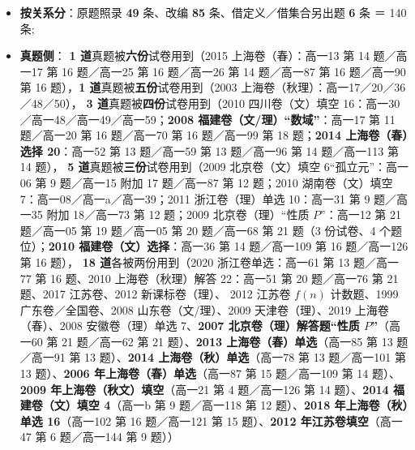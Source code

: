 \documentclass[a4paper,11pt]{article}
\providecommand{\tightlist}{%
  \setlength{\itemsep}{0pt}\setlength{\parskip}{0pt}}
\begin{document}
\begin{itemize}
\tightlist
\item
  \textbf{按关系分}：原题照录 \textbf{49} 条、改编 \textbf{85} 条、借定义／借集合另出题 \textbf{6} 条 ＝ 140 条;
\item
  \textbf{真题侧}：
  \textbf{1 道}真题被\textbf{六份}试卷用到（2015 上海卷（春）：高一13 第 14 题／高一17 第 16 题／高一25 第 16 题／高一26 第 14 题／高一87 第 16 题／高一90 第 16 题），\textbf{1 道}真题被\textbf{五份}试卷用到（2003 上海卷（秋理）：高一17／20／36／48／50），
  \textbf{3 道}真题被\textbf{四份}试卷用到（2010 四川卷（文）填空 16：高一30／高一48／高一49／高一59；\textbf{2008 福建卷（文/理）``数域''}：高一17 第 11 题／高一20 第 16 题／高一70 第 16 题／高一99 第 18 题；\textbf{2014 上海卷（春）选择 20}：高一52 第 13 题／高一59 第 13 题／高一96 第 14 题／高一113 第 14 题），
  \textbf{5 道}真题被\textbf{三份}试卷用到（2009 北京卷（文）填空 6``孤立元''：高一06 第 9 题／高一15 附加 17 题／高一87 第 12 题；2010 湖南卷（文）填空 7：高一08／高一a／高一39；2011 浙江卷（理）单选 10：高一31 第 9 题／高一35 附加 18／高一73 第 12 题；2009 北京卷（理）``性质 \(P\)''：高一12 第 21 题／高一05 第 19 题／高一05 第 20 题／高一68 第 21 题（3 份试卷、4 个题位）；\textbf{2010 福建卷（文）选择}：高一36 第 14 题／高一109 第 16 题／高一126 第 16 题），
  \textbf{18 道}各被两份用到（2020 浙江卷单选：高一61 第 13 题／高一77 第 16 题、2010 上海卷（秋理）解答 22：高一51 第 20 题／高一76 第 21 题、2017 江苏卷、2012 新课标卷（理）、
  2012 江苏卷 \(f(n)\) 计数题、1999 广东卷／全国卷、2008 山东卷（文/理）、2009 天津卷（理）、2019 上海卷（春）、2008 安徽卷（理）单选 7、\textbf{2007 北京卷（理）解答题``性质 \(P\)''}（高一60 第 21 题／高一62 第 21 题）、\textbf{2013 上海卷（春）单选}（高一85 第 13 题／高一91 第 13 题）、\textbf{2014 上海卷（秋）单选}（高一78 第 13 题／高一101 第 13 题）、\textbf{2006 年上海卷（春）单选}（高一87 第 15 题／高一109 第 14 题）、\textbf{2009 年上海卷（秋文）填空}（高一21 第 4 题／高一126 第 14 题）、\textbf{2014 福建卷（文）填空 4}（高一b 第 9 题／高一118 第 12 题）、\textbf{2018 年上海卷（秋）单选 16}（高一102 第 16 题／高一121 第 15 题）、\textbf{2012 年江苏卷填空}（高一47 第 6 题／高一144 第 9 题））

\end{itemize}
\end{document}
